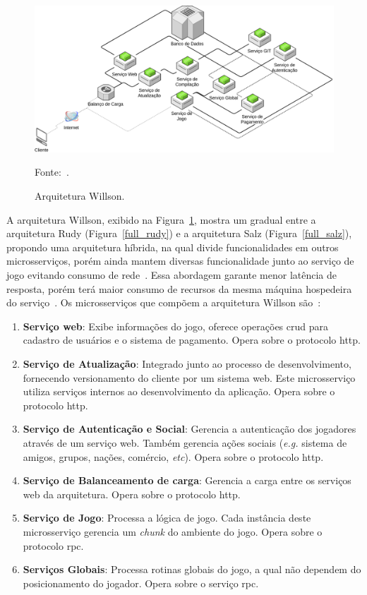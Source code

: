 \begin{figure}[htb!]
  \caption{Arquitetura Willson.}
  \label{full_willson}
  \includegraphics[width=\textwidth]{arquiteturas/full_willson.png}
  \centering

  Fonte:~\cite{stephenclarkewillson2017}.
\end{figure}


A arquitetura Willson, exibido na Figura~\ref{full_willson}, mostra um gradual entre a arquitetura Rudy (Figura~\ref{full_rudy}) e a arquitetura Salz (Figura~\ref{full_salz}), propondo uma arquitetura híbrida, na qual divide funcionalidades em outros microsserviços, porém ainda mantem diversas funcionalidade junto ao serviço de jogo evitando consumo de rede~\cite{albion_online_unite, willson}.
%
Essa abordagem garante menor latência de resposta, porém terá maior consumo de recursos da mesma máquina hospedeira do serviço~\cite{willson}.
%
Os microsserviços que compõem a arquitetura Willson são~\cite{willson, stephenclarkewillson2017}:

\begin{enumerate}
  \item \textbf{Serviço web}: Exibe informações do jogo, oferece operações \ac{crud} para cadastro de usuários e o sistema de pagamento. Opera sobre o protocolo \ac{http}.
  \item \textbf{Serviço de Atualização}: Integrado junto ao processo de desenvolvimento, fornecendo versionamento do cliente por um sistema web. Este microsserviço utiliza serviços internos ao desenvolvimento da aplicação. Opera sobre o protocolo \ac{http}.
  \item \textbf{Serviço de Autenticação e Social}: Gerencia a autenticação dos jogadores através de um serviço web. Também gerencia ações sociais (\textit{e.g.} sistema de amigos, grupos, nações, comércio, \textit{etc}). Opera sobre o protocolo \ac{http}.
  \item \textbf{Serviço de Balanceamento de carga}: Gerencia a carga entre os serviços web da arquitetura. Opera sobre o protocolo \ac{http}.
  \item \textbf{Serviço de Jogo}: Processa a lógica de jogo. Cada instância deste microsserviço gerencia um \textit{chunk} do ambiente do jogo. Opera sobre o protocolo \ac{rpc}.
  \item \textbf{Serviços Globais}: Processa rotinas globais do jogo, a qual não dependem do posicionamento do jogador. Opera sobre o serviço \ac{rpc}.
\end{enumerate}

